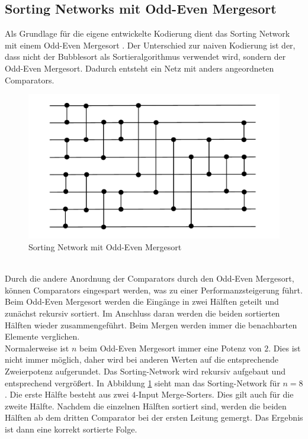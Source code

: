 \documentclass[a4,abstract=on]{scrartcl}
\begin{document}
	\subsection{Sorting Networks mit Odd-Even Mergesort}
Als Grundlage für die eigene entwickelte Kodierung dient das Sorting Network mit einem Odd-Even Mergesort \cite[vgl.][]{odd-even}. Der Unterschied zur naiven Kodierung ist der, dass nicht der Bubblesort als Sortieralgorithmus verwendet wird, sondern der Odd-Even Mergesort. Dadurch entsteht ein Netz mit anders angeordneten Comparators.

\begin{figure}[H]
\centering
\includegraphics[width=\textwidth]{sorting_network_odd_even.pdf}
\caption{Sorting Network mit Odd-Even Mergesort}
\label{fig:odd-even-mergesort}
\end{figure}
\ \\
Durch die andere Anordnung der Comparators durch den Odd-Even Mergesort, können Comparators eingespart werden, was zu einer Performanzsteigerung führt. Beim Odd-Even Mergesort werden die Eingänge in zwei Hälften geteilt und zunächst rekursiv sortiert. Im Anschluss daran werden die beiden sortierten Hälften wieder zusammengeführt. Beim Mergen werden immer die benachbarten Elemente verglichen.\\
Normalerweise ist $n$ beim Odd-Even Mergesort immer eine Potenz von $2$. Dies ist nicht immer möglich, daher wird bei anderen Werten auf die entsprechende Zweierpotenz aufgerundet. Das Sorting-Network wird rekursiv aufgebaut und entsprechend vergrößert. In Abbildung \ref{fig:odd-even-mergesort} sieht man das Sorting-Network für $n=8$. Die erste Hälfte besteht aus zwei $4$-Input Merge-Sorters. Dies gilt auch für die zweite Hälfte. Nachdem die einzelnen Hälften sortiert sind, werden die beiden Hälften ab dem dritten Comparator bei der ersten Leitung gemergt. Das Ergebnis ist dann eine korrekt sortierte Folge.
\end{document}
